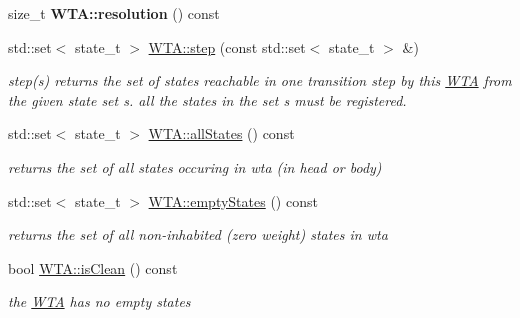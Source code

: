 \begin{DoxyCompactItemize}
\mbox{\label{group__schemata_ga625d9da502c5cd554797ebe9ee9023c4}} 
size\+\_\+t {\bfseries W\+T\+A\+::resolution} () const
\item 
\mbox{\label{group__schemata_gae6fb2dbd82ed290528b90ee7bb4b6ccc}} 
std\+::set$<$ state\+\_\+t $>$ \mbox{\hyperlink{group__schemata_gae6fb2dbd82ed290528b90ee7bb4b6ccc}{W\+T\+A\+::step}} (const std\+::set$<$ state\+\_\+t $>$ \&)
\begin{DoxyCompactList}\small\item\em step(s) returns the set of states reachable in one transition step by this \mbox{\hyperlink{classWTA}{W\+TA}} from the given state set s. all the states in the set s must be registered. \end{DoxyCompactList}\item 
\mbox{\label{group__schemata_gab8ea841b4a1e71ef70d3fda927f0507d}} 
std\+::set$<$ state\+\_\+t $>$ \mbox{\hyperlink{group__schemata_gab8ea841b4a1e71ef70d3fda927f0507d}{W\+T\+A\+::all\+States}} () const
\begin{DoxyCompactList}\small\item\em returns the set of all states occuring in wta (in head or body) \end{DoxyCompactList}\item 
\mbox{\label{group__schemata_gaea41b32c37bbe955d0359039d7731fea}} 
std\+::set$<$ state\+\_\+t $>$ \mbox{\hyperlink{group__schemata_gaea41b32c37bbe955d0359039d7731fea}{W\+T\+A\+::empty\+States}} () const
\begin{DoxyCompactList}\small\item\em returns the set of all non-\/inhabited (zero weight) states in wta \end{DoxyCompactList}\item 
\mbox{\label{group__schemata_ga9ef4193ae949ae7c9e52d30720e37202}} 
bool \mbox{\hyperlink{group__schemata_ga9ef4193ae949ae7c9e52d30720e37202}{W\+T\+A\+::is\+Clean}} () const
\begin{DoxyCompactList}\small\item\em the \mbox{\hyperlink{classWTA}{W\+TA}} has no empty states \end{DoxyCompactList}\item 
\mbox{\label{group__schemata_gaec169477bdc2cf883916c38dbc18e577}} 

\end{DoxyCompactItemize}
